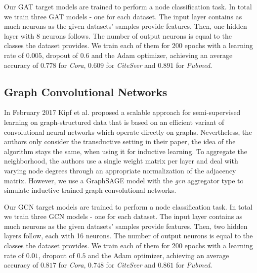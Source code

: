       Our GAT target models are trained to perform a node classification task.
      In total we train three GAT models - one for each dataset.
      The input layer contains as much neurons as the given datasets' samples provide features.
      Then, one hidden layer with 8 neurons follows.
      The number of output neurons is equal to the classes the dataset provides.
      We train each of them for 200 epochs with a learning rate of $0.005$, dropout of $0.6$ and the Adam optimizer, achieving an average accuracy of $0.778$ for \emph{Cora}, $0.609$ for \emph{CiteSeer} and $0.891$ for \emph{Pubmed}.

    \subsection*{Graph Convolutional Networks}
      In February 2017 Kipf et al. \cite{gcn} proposed a scalable approach for semi-supervised learning on graph-structured data that is based on an efficient variant of convolutional neural networks which operate directly on graphs.
      Nevertheless, the authors only consider the transductive setting in their paper, the idea of the algorithm stays the same, when using it for inductive learning.
      To aggregate the neighborhood, the authors use a single weight matrix per layer and deal with varying node degrees through an appropriate normalization of the adjacency matrix.
      However, we use a GraphSAGE model with the \emph{gcn} aggregator type to simulate inductive trained graph convolutional networks.

      Our GCN target models are trained to perform a node classification task.
      In total we train three GCN models - one for each dataset.
      The input layer contains as much neurons as the given datasets' samples provide features.
      Then, two hidden layers follow, each with 16 neurons.
      The number of output neurons is equal to the classes the dataset provides.
      We train each of them for 200 epochs with a learning rate of $0.01$, dropout of $0.5$ and the Adam optimizer, achieving an average accuracy of $0.817$ for \emph{Cora}, $0.748$ for \emph{CiteSeer} and $0.861$ for \emph{Pubmed}. 

